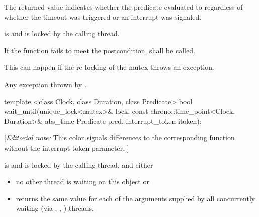 {\begin{itemdescr}
 \pnum \begin{note} The returned value indicates whether the predicate evaluated to
         regardless of whether the timeout was triggered
        {\color{diffcolor} or an interrupt was signaled}. \end{note}

 \pnum \postconditions {} is  and 
        is locked by the calling thread.

 \pnum \remarks
        If the function fails to meet the postcondition, 
        shall be called.
        \begin{note} This can happen if the re-locking of the mutex throws an exception. \end{note}

 \pnum \throws Any exception thrown by .

\end{itemdescr}



\begin{itemdecl}
template <class Clock, class Duration, class Predicate>
  bool wait_until(unique_lock<mutex>& lock,
                  const chrono::time_point<Clock, Duration>& abs_time
                  Predicate pred,
                  interrupt_token itoken);
\end{itemdecl}
{\color{blue}
[{\itshape{}Editorial note:} {\color{diffcolor}This color signals differences to the corresponding  function without the interrupt token parameter.} ]
}
\begin{itemdescr}
 \pnum \requires {} is  and  is
        locked by the calling thread, and either
        \begin{itemize}
         \item no other thread is waiting on this  object or
         \item {} returns the same value for each of the 
                arguments supplied by all concurrently waiting
                (via , , ) threads.
        \end{itemize}


\end{itemdescr}}
